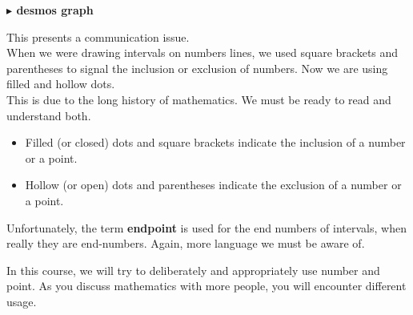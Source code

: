 \documentclass{ximera}
\begin{document}
\begin{example}
\begin{explanation}
\begin{image}
\end{image}

\end{explanation}
\end{example}





\begin{onlineOnly}
\textbf{\textcolor{blue!55!black}{$\blacktriangleright$ desmos graph}} 
\begin{center}
\end{center}
\end{onlineOnly}




This presents a communication issue.  \\


When we were drawing intervals on numbers lines, we used square brackets and parentheses to signal the inclusion or exclusion of numbers.  Now we are using filled and hollow dots. \\

This is due to the long history of mathematics.  We must be ready to read and understand both.


\begin{itemize}
\item Filled (or closed) dots and square brackets indicate the inclusion of a number or a point.
\item Hollow (or open) dots and parentheses indicate the exclusion of a number or a point.
\end{itemize}

Unfortunately, the term \textbf{endpoint} is used for the end numbers of intervals, when really they are end-numbers. Again, more language we must be aware of.

In this course, we will try to deliberately and appropriately use number and point.  As you discuss mathematics with more people, you will encounter different usage.
\end{document}
